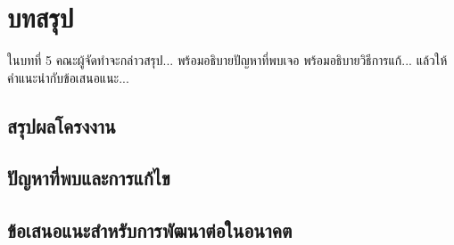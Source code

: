 \chapter{บทสรุป}
    ในบทที่ 5 คณะผู้จัดทำจะกล่าวสรุป... พร้อมอธิบายปัญหาที่พบเจอ พร้อมอธิบายวิธีการแก้... แล้วให้คำแนะนำกับข้อเสนอแนะ...
\section{สรุปผลโครงงาน}

\pagebreak
\section{ปัญหาที่พบและการแก้ไข}

\pagebreak
\section{ข้อเสนอแนะสำหรับการพัฒนาต่อในอนาคต}
